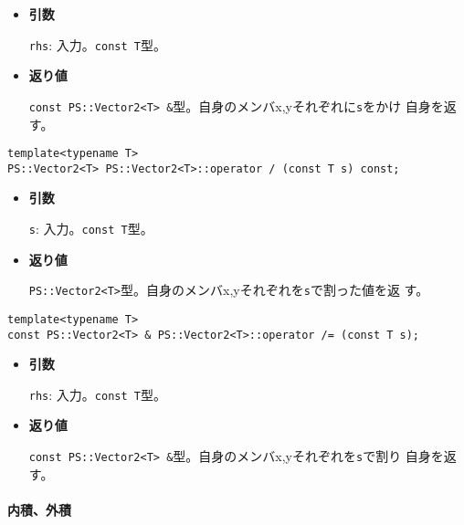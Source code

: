 \begin{itemize}

\item{{\bf 引数}}

{\tt rhs}: 入力。{\tt const T}型。

\item{{\bf 返り値}}

{\tt const PS::Vector2<T> \&}型。自身のメンバx,yそれぞれに{\tt s}をかけ
自身を返す。

\end{itemize}


\begin{screen}
\begin{verbatim}
template<typename T>
PS::Vector2<T> PS::Vector2<T>::operator / (const T s) const;
\end{verbatim}
\end{screen}

\begin{itemize}

\item{{\bf 引数}}

{\tt s}: 入力。{\tt const T}型。

\item{{\bf 返り値}}

{\tt PS::Vector2<T>}型。自身のメンバx,yそれぞれを{\tt s}で割った値を返
す。

\end{itemize}


\begin{screen}
\begin{verbatim}
template<typename T>
const PS::Vector2<T> & PS::Vector2<T>::operator /= (const T s);
\end{verbatim}
\end{screen}

\begin{itemize}

\item{{\bf 引数}}

{\tt rhs}: 入力。{\tt const T}型。

\item{{\bf 返り値}}

{\tt const PS::Vector2<T> \&}型。自身のメンバx,yそれぞれを{\tt s}で割り
自身を返す。

\end{itemize}


\paragraph{内積、外積}
\mbox{}

